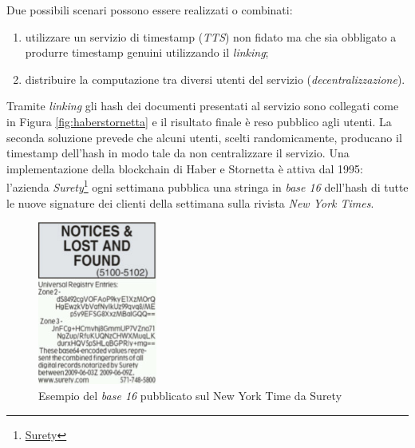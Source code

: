 Due possibili scenari possono essere realizzati o combinati:
\begin{enumerate}[1.]
    \item utilizzare un servizio di timestamp (\textit{TTS}) non fidato ma che sia obbligato a produrre timestamp genuini utilizzando il \textit{linking};
    \item distribuire la computazione tra diversi utenti del servizio (\textit{decentralizzazione}).
\end{enumerate}
Tramite \textit{linking} gli hash dei documenti presentati al servizio sono collegati come in Figura \ref{fig:haberstornetta} e il risultato finale è reso pubblico agli utenti. La seconda soluzione prevede che alcuni utenti, scelti randomicamente, producano il timestamp dell'hash in modo tale da non centralizzare il servizio.\newline
Una implementazione della blockchain di Haber e Stornetta è attiva dal 1995: l'azienda \textit{Surety}\footnote{\href{http://surety.com}{Surety}} ogni settimana pubblica una stringa in \textit{base 16} dell'hash di tutte le nuove signature dei clienti della settimana sulla rivista \textit{New York Times}.
\begin{figure}[H]
    \centering
    \includegraphics[width=0.35\textwidth]{images/nyt.jpg}
    \caption{Esempio del \textit{base 16} pubblicato sul New York Time da Surety}
\end{figure}

